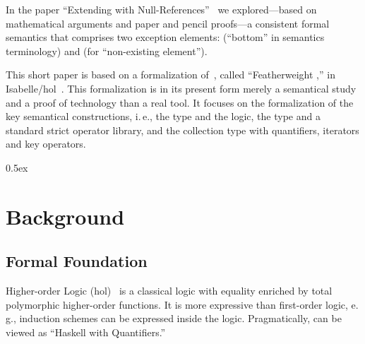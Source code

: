 \documentclass[11pt,a4paper,openright,twoside,abstracton]{scrreprt}
\newcommand{\ie}{i.\,e.\xspace}
\newcommand{\eg}{e.\,g.\xspace}
\begin{document}
In the paper ``Extending \OCL with
Null-References''~\cite{brucker.ea:ocl-null:2009} we explored---based
on mathematical arguments and paper and pencil proofs---a consistent
formal semantics that comprises two exception elements:
 (``bottom'' in semantics terminology) and
 (for ``non-existing element'').

This short paper is based on a formalization
of~\cite{brucker.ea:ocl-null:2009}, called ``Featherweight \OCL,'' in
Isabelle/\acs{hol}~\cite{nipkow.ea:isabelle:2002}.  This formalization
is in its present form merely a semantical study and a proof of
technology than a real tool. It focuses on the formalization of the
key semantical constructions, \ie, the type  and
the logic, the type  and a standard strict operator
library, and the collection type  with quantifiers,
iterators and key operators.



\parindent 0pt\parskip 0.5ex


\chapter{Background}

\section{Formal Foundation}
Higher-order Logic
(\acs{hol})~\cite{church:types:1940,andrews:introduction:2002} is a
classical logic with equality enriched by total polymorphic
higher-order functions. It is more expressive than first-order logic,
\eg, induction schemes can be expressed inside the
logic. Pragmatically, \HOL can be viewed as ``Haskell with
Quantifiers.''
\end{document}
